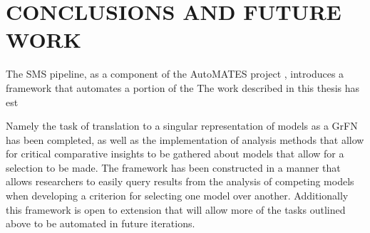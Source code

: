 \chapter{CONCLUSIONS AND FUTURE WORK\label{chapter:conc_and_future}}




The SMS pipeline, as a component of the AutoMATES project \cite{pyarelal2019}, introduces a framework that automates a portion of the
The work described in this thesis has est

Namely the task of translation to a singular representation of models as a GrFN has been completed, as well as the implementation of analysis methods that allow for critical comparative insights to be gathered about models that allow for a selection to be made.
The framework has been constructed in a manner that allows researchers to easily query results from the analysis of competing models when developing a criterion for selecting one model over another.
Additionally this framework is open to extension that will allow more of the tasks outlined above to be automated in future iterations.

